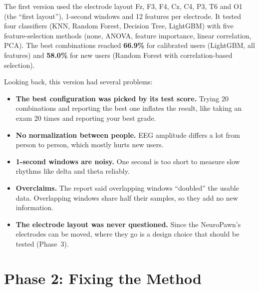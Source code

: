 \documentclass[12pt]{article}
\begin{document}
The first version used the electrode layout Fz, F3, F4, Cz, C4, P3, T6 and O1 (the ``first layout''), 1-second windows and 12 features per electrode. It tested four classifiers (KNN, Random Forest, Decision Tree, LightGBM) with five feature-selection methods (none, ANOVA, feature importance, linear correlation, PCA). The best combinations reached \textbf{66.9\%} for calibrated users (LightGBM, all features) and \textbf{58.0\%} for new users (Random Forest with correlation-based selection).

Looking back, this version had several problems:
\begin{itemize}
    \item \textbf{The best configuration was picked by its test score.} Trying 20 combinations and reporting the best one inflates the result, like taking an exam 20 times and reporting your best grade.
    \item \textbf{No normalization between people.} EEG amplitude differs a lot from person to person, which mostly hurts new users.
    \item \textbf{1-second windows are noisy.} One second is too short to measure slow rhythms like delta and theta reliably.
    \item \textbf{Overclaims.} The report said overlapping windows ``doubled'' the usable data. Overlapping windows share half their samples, so they add no new information.
    \item \textbf{The electrode layout was never questioned.} Since the NeuroPawn's electrodes can be moved, where they go is a design choice that should be tested (Phase~3).
\end{itemize}

\section{Phase 2: Fixing the Method}
\end{document}
